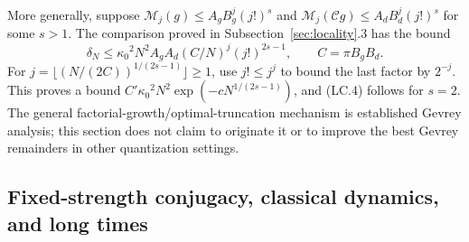 More generally, suppose \(\mathcal M_j(g)\leq A_gB_g^j(j!)^s\) and \(\mathcal M_j(\mathcal Cg)\leq A_dB_d^j(j!)^s\) for some \(s>1\). The comparison proved in Subsection~\ref{sec:locality}.3 has the bound \[
 \delta_N\leq{\kappa_0}^2N^2A_gA_d(C/N)^j(j!)^{2s-1},
 \qquad C=\pi B_gB_d.                                      \tag{LC.18}
\] For \(j=\lfloor(N/(2C))^{1/(2s-1)}\rfloor\geq1\), use \(j!\leq j^j\) to bound the last factor by \(2^{-j}\). This proves a bound \(C'{\kappa_0}^2N^2\exp(-cN^{1/(2s-1)})\), and (LC.4) follows for \(s=2\). The general factorial-growth/optimal-truncation mechanism is established Gevrey analysis; this section does not claim to originate it or to improve the best Gevrey remainders in other quantization settings.

\subsection{Fixed-strength conjugacy, classical dynamics, and long times}\label{locality:fixed-strength-conjugacy-classical-dynamics-and-long-times}

